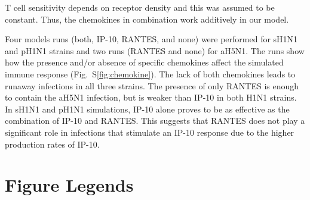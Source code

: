 \documentclass[10pt]{article}
\begin{document}
T cell sensitivity depends on receptor density \cite{Desmetz2006} and this was assumed to be constant.  Thus, the chemokines in combination work additively in our model. 

Four models runs (both, IP-10, RANTES, and none) were performed for sH1N1 and pH1N1 strains and two runs (RANTES and none) for  aH5N1.  The runs show how the presence and/or absence of specific chemokines affect the simulated immune response (Fig.~S\ref{fig:chemokine}).  The lack of both chemokines leads to runaway infections in all three strains.  The presence of only RANTES is enough to contain the aH5N1 infection, but is weaker than IP-10 in both H1N1 strains.  In sH1N1 and pH1N1 simulations, IP-10 alone proves to be as effective as the combination of IP-10 and RANTES.  This suggests that RANTES does not play a significant role in infections that stimulate an IP-10 response due to the higher production rates of IP-10.  



\pagebreak

\section*{Figure Legends}

\end{document}
